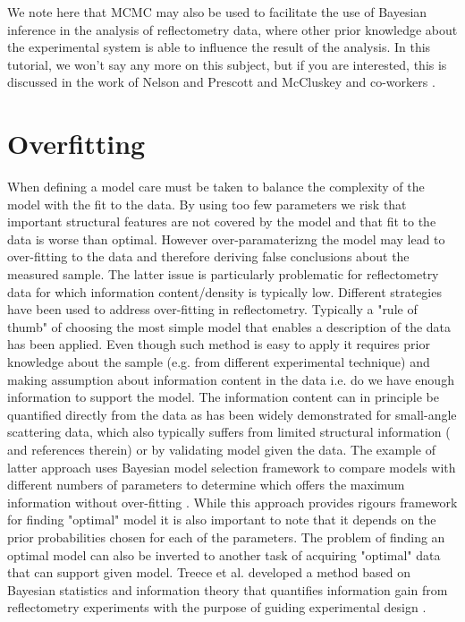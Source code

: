 \documentclass[
 reprint,
 superscriptaddress,
 amsmath,amssymb,
 aps,
]{revtex4-1}
\begin{document}
We note here that MCMC may also be used to facilitate the use of Bayesian inference in the analysis of reflectometry data, where other prior knowledge about the experimental system is able to influence the result of the analysis.
In this tutorial, we won't say any more on this subject, but if you are interested, this is discussed in the work of Nelson and Prescott \cite{nelson_refnx_2019} and McCluskey and co-workers \cite{mccluskey_general_2020}.

\section{Overfitting}

When defining a model care must be taken to balance the complexity of the model with the fit to the data.
By using too few parameters we risk that important structural features are not covered by the model and that fit to the data is worse than optimal. 
However over-paramaterizng the model may lead to over-fitting to the data and therefore deriving false conclusions about the measured sample. 
The latter issue is particularly problematic for reflectometry data for which information content/density is typically low. 
Different strategies have been used to address over-fitting in reflectometry. Typically a "rule of thumb" of choosing the most simple model that enables a description
of the data has been applied. Even though such method is easy to apply it requires prior knowledge about the sample (e.g. from different experimental technique) and making assumption about information content in the data i.e. do we have enough information to support the model. 
The information content can in principle be quantified directly from the data as has been widely demonstrated for small-angle scattering data, which also typically suffers from limited structural information (\cite{Larsen_2018} and references therein) or by validating model given the data. 
The example of latter approach uses Bayesian model selection framework to compare models with different numbers of parameters to determine which  offers the maximum information without over-fitting \cite{hughes_model_selection_2019, McCluskey_bayesian_model_selection_2020}. While this approach provides rigours framework for finding "optimal" model it is also important to note that it depends on the prior probabilities chosen for each of the parameters.
The problem of finding an optimal model can also be inverted to another task of acquiring "optimal" data that can support given model. Treece et al. developed a method based on Bayesian statistics and information theory that quantifies information gain from reflectometry experiments with the purpose of guiding experimental design \cite{Treece_2019}. 
\end{document}
